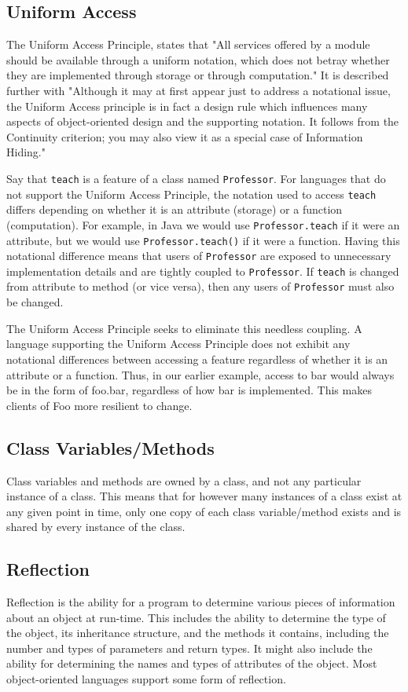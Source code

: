 \documentclass[12pt,a4paper,final,twoside,onecolumn,titlepage]{book}
\begin{document}
\subsection{Uniform Access}
The Uniform Access Principle, states that "All services offered by a module should be available through a uniform notation, which does not betray whether they are implemented through storage or through computation." It is described further with "Although it may at first appear just to address a notational issue, the Uniform Access principle is in fact a design rule which influences many aspects of object-oriented design and the supporting notation. It follows from the Continuity criterion; you may also view it as a special case of Information Hiding."

Say that \texttt{teach} is a feature of a class named \texttt{Professor}. For languages that do not support the Uniform Access Principle, the notation used to access \texttt{teach} differs depending on whether it is an attribute (storage) or a function (computation). For example, in Java we would use \texttt{Professor.teach} if it were an attribute, but we would use \texttt{Professor.teach()} if it were a function. Having this notational difference means that users of \texttt{Professor} are exposed to unnecessary implementation details and are tightly coupled to \texttt{Professor}. If \texttt{teach} is changed from attribute to method (or vice versa), then any users of \texttt{Professor} must also be changed.

The Uniform Access Principle seeks to eliminate this needless coupling. A language supporting the Uniform Access Principle does not exhibit any notational differences between accessing a feature regardless of whether it is an attribute or a function. Thus, in our earlier example, access to bar would always be in the form of foo.bar, regardless of how bar is implemented. This makes clients of Foo more resilient to change.

\subsection{Class Variables/Methods}
Class variables and methods are owned by a class, and not any particular instance of a class. This means that for however many instances of a class exist at any given point in time, only one copy of each class variable/method exists and is shared by every instance of the class.

\subsection{Reflection}
Reflection is the ability for a program to determine various pieces of information about an object at run-time. This includes the ability to determine the type of the object, its inheritance structure, and the methods it contains, including the number and types of parameters and return types. It might also include the ability for determining the names and types of attributes of the object. Most object-oriented languages support some form of reflection.
\end{document}
